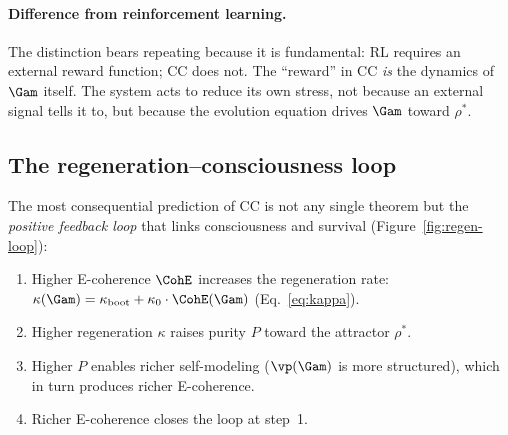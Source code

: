\paragraph{Difference from reinforcement learning.}
The distinction bears repeating because it is fundamental: RL requires an external reward
function; CC does not.  The ``reward'' in CC \emph{is} the dynamics of $\Gam$ itself.
The system acts to reduce its own stress, not because an external signal tells it to, but
because the evolution equation drives $\Gam$ toward $\rho^*$.

\subsection{The regeneration--consciousness loop}
\label{subsec:regen-loop}

The most consequential prediction of CC is not any single theorem but the
\emph{positive feedback loop} that links consciousness and survival
(Figure~\ref{fig:regen-loop}):

\begin{enumerate}[leftmargin=2em]
  \item Higher E-coherence $\CohE$ increases the regeneration rate:
        $\kappa(\Gam) = \kappa_{\mathrm{boot}} + \kappa_0 \cdot \CohE(\Gam)$
        (Eq.~\ref{eq:kappa}).
  \item Higher regeneration $\kappa$ raises purity $P$ toward the attractor $\rho^*$.
  \item Higher $P$ enables richer self-modeling ($\vp(\Gam)$ is more structured), which
        in turn produces richer E-coherence.
  \item Richer E-coherence closes the loop at step~1.
\end{enumerate}

